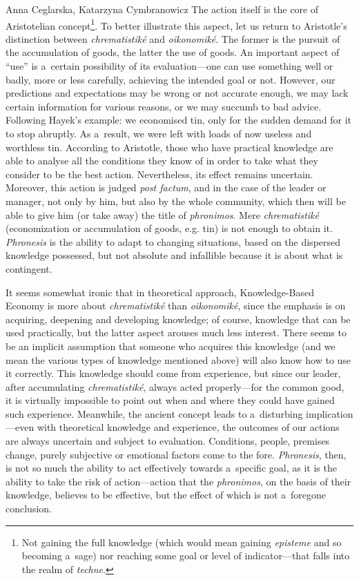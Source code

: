 \begin{artengenv2auth}{Anna Ceglarska, Katarzyna Cymbranowicz}
The action itself is the core of Aristotelian concept\footnote{Not gaining the full knowledge (which would mean gaining \textit{episteme} and so becoming a~sage) nor reaching some goal or level of indicator---that falls into the realm of \textit{techne}.}. To better illustrate this aspect, let us return to Aristotle's distinction between \textit{chrematistiké} and \textit{oikonomiké}. The former is the pursuit of the accumulation of goods, the latter the use of goods. An important aspect of ``use'' is a~certain possibility of its evaluation---one can use something well or badly, more or less carefully, achieving the intended goal or not. However, our predictions and expectations may be wrong or not accurate enough, we may lack certain information for various reasons, or we may succumb to bad advice. Following Hayek's example: we economised tin, only for the sudden demand for it to stop abruptly. As a~result, we were left with loads of now useless and worthless tin. According to Aristotle, those who have practical knowledge are able to analyse all the conditions they know of in order to take what they consider to be the best action. Nevertheless, its effect remains uncertain. Moreover, this action is judged \textit{post factum}, and in the case of the leader or manager, not only by him, but also by the whole community, which then will be able to give him (or take away) the title of \textit{phronimos}. Mere \textit{chrematistiké} (economization or accumulation of goods, e.g. tin) is not enough to obtain it. \textit{Phronesis} is the ability to adapt to changing situations, based on the dispersed knowledge possessed, but not absolute and infallible because it is about what is contingent.



It seems somewhat ironic that in theoretical approach, Knowledge-Based Economy is more about \textit{chrematistiké} than \textit{oikonomiké}, since the emphasis is on acquiring, deepening and developing knowledge; of course, knowledge that can be used practically, but the latter aspect arouses much less interest. There seems to be an implicit assumption that someone who acquires this knowledge (and we mean the various types of knowledge mentioned above) will also know how to use it correctly. This knowledge should come from experience, but since our leader, after accumulating \textit{chrematistiké}, always acted properly---for the common good, it is virtually impossible to point out when and where they could have gained such experience. Meanwhile, the ancient concept leads to a~disturbing implication---even with theoretical knowledge and experience, the outcomes of our actions are always uncertain and subject to evaluation. Conditions, people, premises change, purely subjective or emotional factors come to the fore. \textit{Phronesis}, then, is not so much the ability to act effectively towards a~specific goal, as it is the ability to take the risk of action---action that the \textit{phronimos}, on the basis of their knowledge, believes to be effective, but the effect of which is not a~foregone conclusion.




\end{artengenv2auth}
